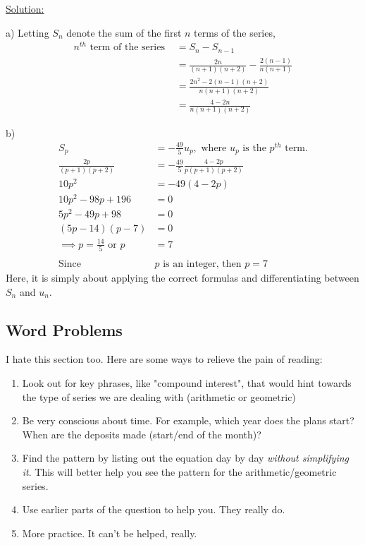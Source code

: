 \documentclass[12pt, a4paper, titlepage]{article}
\begin{document}
\begin{flushright}
\end{flushright}

\underline{Solution:}

a) Letting $S_n$ denote the sum of the first $n$ terms of the series,
\begin{align*}
    n^{th} \text{ term of the series } &= S_n - S_{n - 1} \\
    &= \frac{2n}{(n + 1)(n + 2)} - \frac{2(n - 1)}{n(n + 1)} \\
    &= \frac{2n^2 - 2(n - 1)(n + 2)}{n(n + 1)(n + 2)} \\
    &= \frac{4 - 2n}{n(n + 1)(n + 2)}
\end{align*}

b)
\begin{align*}
    S_p &= -\frac{49}{5} u_p, \text{ where } u_p \text{ is the } p^{th} \text{ term.} \\
    \frac{2p}{(p + 1)(p + 2)} &= -\frac{49}{5} \frac{4 - 2p}{p(p + 1)(p + 2)} \\
    10p^2 &= -49(4 - 2p) \\
    10p^2 - 98p + 196 &= 0 \\
    5p^2 - 49p + 98 &= 0 \\
    (5p - 14)(p - 7) &= 0 \\
    \implies p = \frac{14}{5} \text{ or } p &= 7 \\ \\
    \text{Since } &p \text{ is an integer, then } p = 7
\end{align*}
Here, it is simply about applying the correct formulas and differentiating between $S_n$ and $u_n$.

\subsection{Word Problems}

I hate this section too. Here are some ways to relieve the pain of reading:

\begin{enumerate}
    \item Look out for key phrases, like "compound interest", that would hint towards the type of series we are dealing with (arithmetic or geometric)
    \item Be very conscious about time. For example, which year does the plans start? When are the deposits made (start/end of the month)?
    \item Find the pattern by listing out the equation day by day \emph{without simplifying it}. This will better help you see the pattern for the arithmetic/geometric series.
    \item Use earlier parts of the question to help you. They really do.
    \item More practice. It can't be helped, really.
\end{enumerate}
\end{document}
